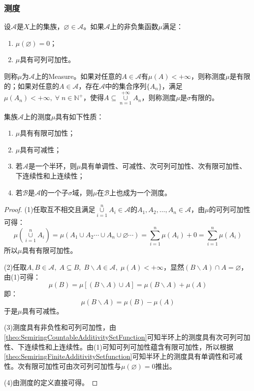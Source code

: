 \subsubsection{测度}
\begin{definition}
	设$\mathscr{A}$是$X$上的集族，$\varnothing\in\mathscr{A}$。如果$\mathscr{A}$上的非负集函数$\mu$满足：
	\begin{enumerate}
		\item $\mu(\varnothing)=0$；
		\item $\mu$具有可列可加性。
	\end{enumerate}
	则称$\mu$为$\mathscr{A}$上的\gls{Measure}。如果对任意的$A\in\mathscr{A}$有$\mu(A)<+\infty$，则称测度$\mu$是有限的；如果对任意的$A\in\mathscr{A}$，存在$\mathscr{A}$中的集合序列$\{A_n\}$，满足$\mu(A_n)<+\infty,\;\forall\;n\in\mathbb{N}^+$，使得$A\subseteq\underset{n=1}{\overset{+\infty}{\cup}}A_n$，则称测度$\mu$是$\sigma$有限的。
\end{definition}
\begin{property}\label{prop:Measure}
	集族$\mathscr{A}$上的测度$\mu$具有如下性质：
	\begin{enumerate}
		\item $\mu$具有有限可加性；
		\item $\mu$具有可减性；
		\item  若$\mathscr{A}$是一个半环，则$\mu$具有单调性、可减性、次可列可加性、次有限可加性、下连续性和上连续性；
		\item 若$\mathscr{B}$是$\mathscr{A}$的一个子$\sigma$域，则$\mu$在$\mathscr{B}$上也成为一个测度。
	\end{enumerate}
\end{property}
\begin{proof}
	(1)任取互不相交且满足$\underset{i=1}{\overset{n}{\cup}}A_i\in\mathscr{A}$的$A_1,A_2,\dots,A_n\in\mathscr{A}$，由$\mu$的可列可加性可得：
	\begin{equation*}
		\mu\left(\underset{i=1}{\overset{n}{\cup}}A_i\right)=\mu(A_1\cup A_2\cdots\cup A_n\cup\varnothing\cdots)=\sum_{i=1}^{n}\mu(A_i)+0=\sum_{i=1}^{n}\mu(A_i)
	\end{equation*}
	所以$\mu$具有有限可加性。\par
	(2)任取$A,B\in\mathscr{A},\;A\subseteq B,\;B\backslash A\in\mathscr{A},\;\mu(A)<+\infty$，显然$(B\backslash A)\cap A=\varnothing$，由(1)可得：
	\begin{equation*}
		\mu(B)=\mu[(B\backslash A)\cup A]=\mu(B\backslash A)+\mu(A)
	\end{equation*}
	即：
	\begin{equation*}
		\mu(B\backslash A)=\mu(B)-\mu(A)
	\end{equation*}
	于是$\mu$具有可减性。\par
	(3)测度具有非负性和可列可加性，由\cref{theo:SemiringCountableAdditivitySetFunction}可知半环上的测度具有次可列可加性、下连续性和上连续性。由(1)可知可列可加性蕴含有限可加性，所以根据\cref{theo:SemiringFiniteAdditivitySetfunction}可知半环上的测度具有单调性和可减性。次有限可加性可由次可列可加性与$\mu(\varnothing)=0$推出。\par
	(4)由测度的定义直接可得。
\end{proof}
